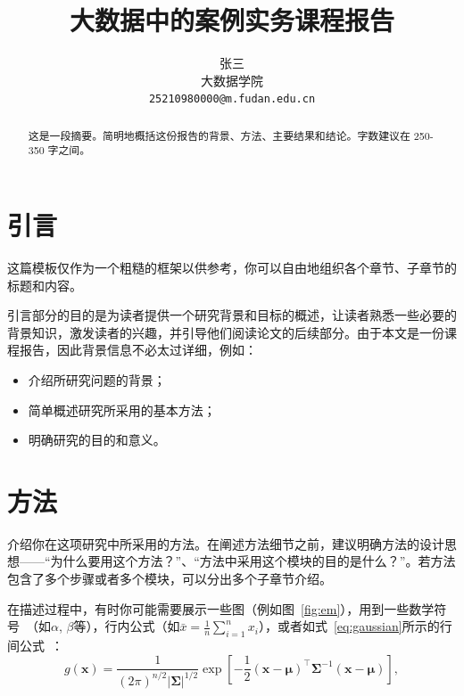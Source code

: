 \documentclass[UTF8]{article}
\title{大数据中的案例实务课程报告}
\author{
    {\hspace{1mm}张三} \\
    大数据学院\\
    \texttt{25210980000@m.fudan.edu.cn} \\
}
\begin{document}
\maketitle


\begin{abstract}
这是一段摘要。简明地概括这份报告的背景、方法、主要结果和结论。字数建议在 250-350 字之间。
\end{abstract}

\section{引言}\label{sec:introduction}
这篇模板仅作为一个粗糙的框架以供参考，你可以自由地组织各个章节、子章节的标题和内容。

引言部分的目的是为读者提供一个研究背景和目标的概述，让读者熟悉一些必要的背景知识，激发读者的兴趣，并引导他们阅读论文的后续部分。由于本文是一份课程报告，因此背景信息不必太过详细，例如：

\begin{itemize}
    \item 介绍所研究问题的背景；
    \item 简单概述研究所采用的基本方法；
    \item 明确研究的目的和意义。
\end{itemize}


\section{方法}\label{sec:methodology}
介绍你在这项研究中所采用的方法。在阐述方法细节之前，建议明确方法的设计思想——“为什么要用这个方法？”、“方法中采用这个模块的目的是什么？”。若方法包含了多个步骤或者多个模块，可以分出多个子章节介绍。

在描述过程中，有时你可能需要展示一些图（例如图~\ref{fig:em}），用到一些数学符号~\cite{downes2002short}（如$\alpha$, $\beta$等），行内公式（如$\bar{x} = \frac{1}{n}\sum_{i=1}^{n}x_i$），或者如式~\eqref{eq:gaussian}所示的行间公式~\cite{do2008multivariate}：
\begin{equation}
    g(\boldsymbol{x}) = 
    \dfrac{1}
    {(2\pi)^{n/2}
    \left|\boldsymbol{\Sigma}\right|^{1/2}}
    \exp
    \left[
    -\dfrac{1}{2}
    (\boldsymbol{x-\mu})^\top
    \boldsymbol{\Sigma}^{-1}
    (\boldsymbol{x-\mu})
    \right],
    \label{eq:gaussian}
\end{equation}
\end{document}
